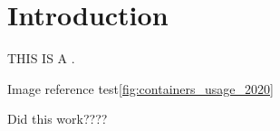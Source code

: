 \section{Introduction}
\label{sec:intro}

\lipsum[1] THIS IS A \cite{Kane2018-fn}.

Image reference test\ref{fig:containers_usage_2020}

Did this work????
